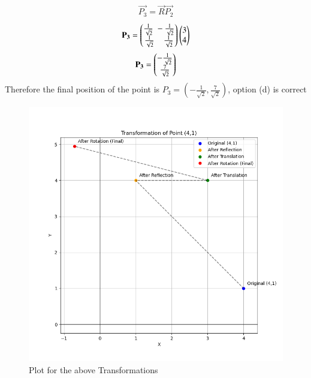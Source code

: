 \documentclass[journal]{IEEEtran}
\begin{document}
\begin{enumerate}[label=(\alph*)]
\begin{align}
                 \vec{P_3}=\vec{R}\vec{P_2}
             \end{align}
             \begin{align}
                 \mathbf{P_3}=\begin{pmatrix}\frac{1}{\sqrt{2}}\;-\frac{1}{\sqrt{2}}\\\frac{1}{\sqrt{2}}\;\;\;\;\frac{1}{\sqrt{2}}\end{pmatrix}\begin{pmatrix}3\\4\end{pmatrix}
             \end{align}
             \begin{align}
                 \mathbf{P_3}=\begin{pmatrix}-\frac{1}{\sqrt{2}}\\\frac{7}{\sqrt{2}}\end{pmatrix}
             \end{align}
             Therefore the final position of the point is $P_3=(-\frac{1}{\sqrt{2}},\frac{7}{\sqrt{2}})$, option (d) is correct
             \end{enumerate}
             \begin{figure}[h]
                 \centering
                 \includegraphics[width=0.9\columnwidth]{figs/fig1.png}
                 \caption{Plot for the above Transformations}
                 \label{fig1}
             \end{figure}
         
\end{document}
